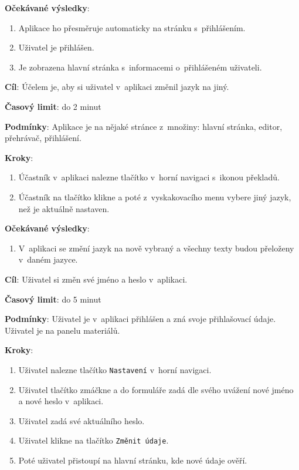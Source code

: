 \textbf{Očekávané výsledky}:

\begin{enumerate}[leftmargin=1.4cm]
    \item Aplikace ho přesměruje automaticky na stránku s~přihlášením.
    \item Uživatel je přihlášen.
    \item Je zobrazena hlavní stránka s~informacemi o~přihlášeném uživateli.
\end{enumerate}


\vspace{1em}

\textbf{Cíl}: Účelem je, aby si uživatel v~aplikaci změnil jazyk na jiný.

\textbf{Časový limit}: do 2 minut

\textbf{Podmínky}: Aplikace je na nějaké stránce z~množiny: hlavní stránka, editor, přehrávač, přihlášení.

\textbf{Kroky}:

\begin{enumerate}[leftmargin=1.4cm]
    \item Účastník v~aplikaci nalezne tlačítko v~horní navigaci s~ikonou překladů.
    \item Účastník na tlačítko klikne a poté z~vyskakovacího menu vybere jiný jazyk, než je aktuálně nastaven.
\end{enumerate}

\textbf{Očekávané výsledky}:

\begin{enumerate}[leftmargin=1.4cm]
    \item V~aplikaci se změní jazyk na nově vybraný a všechny texty budou přeloženy v~daném jazyce.
\end{enumerate}






\vspace{1em}

\textbf{Cíl}: Uživatel si změn své jméno a heslo v~aplikaci.

\textbf{Časový limit}: do 5 minut

\textbf{Podmínky}: Uživatel je v~aplikaci přihlášen a zná svoje přihlašovací údaje. Uživatel je na panelu materiálů.

\textbf{Kroky}:

\begin{enumerate}[leftmargin=1.4cm]
    \item Uživatel nalezne tlačítko \verb|Nastavení| v~horní navigaci.
    \item Uživatel tlačítko zmáčkne a do formuláře zadá dle svého uvážení nové jméno a nové heslo v~aplikaci.
    \item Uživatel zadá své aktuálního heslo.
    \item Uživatel klikne na tlačítko \verb|Změnit údaje|.
    \item Poté uživatel přistoupí na hlavní stránku, kde nové údaje ověří.
\end{enumerate}

